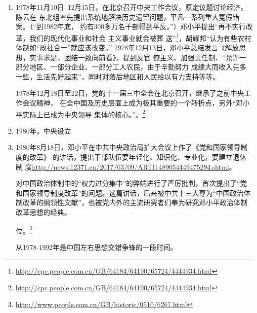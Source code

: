 \begin{enumerate}
\item 1978年11月10日--12月15日，在北京召开中央工作会议，原定议题讨论经济。陈云在
  东北组率先提出系统地解决历史遗留问题，平凡一系列重大冤假错案。（“到1982年底，
  约有300多万名干部得到平反。”）邓小平提出``再不实行改革，我们的现代化事业和社会
  主义事业就会被葬
  送''\footnote{\url{http://cpc.people.com.cn/GB/64184/64190/65724/4444934.html}}，胡耀邦``认为有些农村体制如“政社合一”就应该改变。''
  1978年12月13日，邓小平总结发言《解放思想，实事求是，团结一致向前看》，提到反官
  僚主义、加强责任制、``允许一部分地区、一部分企业、一部分工人农民，由于辛勤努力
  成绩大而收入先多一些，生活先好起来''，同时对落后地区和人民给以有力支持等等。
  
  1978年12月18日至22日，党的十一届三中全会在北京召开，继承了之前中央工作会议精神，
  在全中国及历史层面上成为极其重要的一个转折点，另外``邓小平实际上已成为中央领导
  集体的核心。''。\footnote{\url{http://cpc.people.com.cn/GB/64184/64190/65724/4444934.html}}

\item 1980年，中央设立

\item 1980年8月18日，邓小平在中共中央政治局扩大会议上作了《党和国家领导制度的改革》
  的讲话，提出干部队伍要年轻化、知识化、专业化，要建立退休制
  度\url{http://news.12371.cn/2017/03/09/ARTI1489054449475294.shtml}。

  对中国政治体制中的“权力过分集中”的弊端进行了严厉批判，首次提出了“党和国家领导制度改革”的问题。这篇讲话，后来被中共十三大尊为“中国政治体制改革的纲领性文献”，也被党内外的主流研究者们奉为研究邓小平政治体制改革思想的经典。






位。\footnote{\url{http://www.people.com.cn/GB/historic/0510/6267.html}}

从1978-1992年是中国左右思想交错争锋的一段时间。

\end{enumerate}









